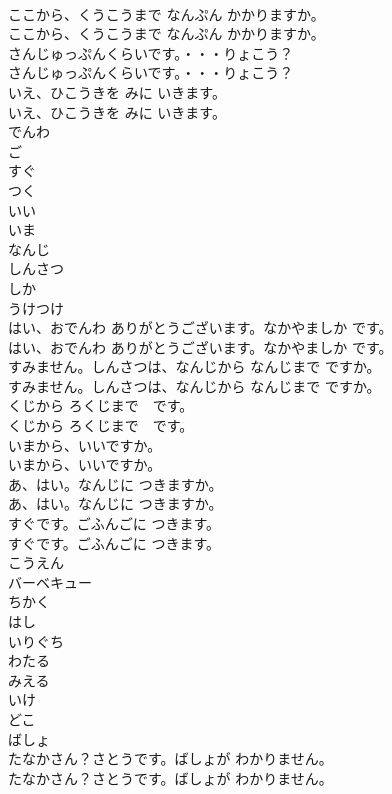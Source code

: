 \documentclass[8pt]{extreport}
\begin{document}
\begin{CJK}{UTF8}{min}
\\	ここから、くうこうまで なんぷん かかりますか。
\\	ここから、くうこうまで なんぷん かかりますか。
\\	さんじゅっぷんくらいです。・・・りょこう？
\\	さんじゅっぷんくらいです。・・・りょこう？
\\	いえ、ひこうきを みに いきます。
\\	いえ、ひこうきを みに いきます。
\\	でんわ
\\	ご
\\	すぐ
\\	つく
\\	いい
\\	いま
\\	なんじ
\\	しんさつ
\\	しか
\\	うけつけ
\\	はい、おでんわ ありがとうございます。なかやましか です。
\\	はい、おでんわ ありがとうございます。なかやましか です。
\\	すみません。しんさつは、なんじから なんじまで ですか。
\\	すみません。しんさつは、なんじから なんじまで ですか。
\\	くじから ろくじまで　です。
\\	くじから ろくじまで　です。
\\	いまから、いいですか。
\\	いまから、いいですか。
\\	あ、はい。なんじに つきますか。
\\	あ、はい。なんじに つきますか。
\\	すぐです。ごふんごに つきます。
\\	すぐです。ごふんごに つきます。
\\	こうえん
\\	バーベキュー
\\	ちかく
\\	はし
\\	いりぐち
\\	わたる
\\	みえる
\\	いけ
\\	どこ
\\	ばしょ
\\	たなかさん？さとうです。ばしょが わかりません。
\\	たなかさん？さとうです。ばしょが わかりません。

\end{CJK}
\end{document}
